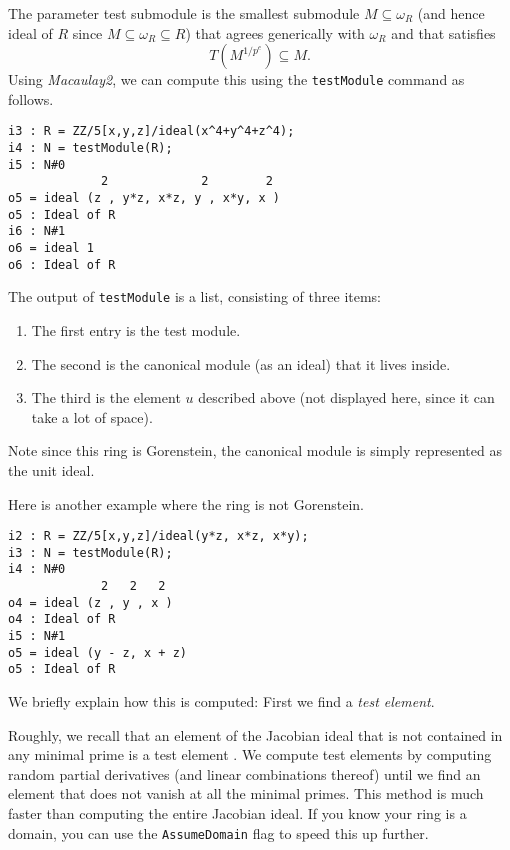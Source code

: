 \documentclass[11pt]{amsart}
\begin{document}
The parameter test submodule is the smallest submodule $M \subseteq \omega_R$ (and hence ideal of $R$ since $M \subseteq \omega_R \subseteq R$) that agrees generically with $\omega_R$ and that satisfies
\[
T (M^{1/p^e}) \subseteq M.
\]
Using \emph{Macaulay2}, we can compute this using the {\tt testModule} command as follows.
\begin{verbatim}
i3 : R = ZZ/5[x,y,z]/ideal(x^4+y^4+z^4);
i4 : N = testModule(R);
i5 : N#0
             2             2        2
o5 = ideal (z , y*z, x*z, y , x*y, x )
o5 : Ideal of R
i6 : N#1
o6 = ideal 1
o6 : Ideal of R
\end{verbatim}
The output of {\tt testModule} is a list, consisting of three items:
\begin{enumerate}
\item The first entry is the test module.
\item The second is the canonical module (as an ideal) that it lives inside.  
\item The third is the element $u$ described above (not displayed here, since it can take a lot of space).  
\end{enumerate}
Note since this ring is Gorenstein, the canonical module is simply represented as the unit ideal.

Here is another example where the ring is not Gorenstein.
\begin{verbatim}
i2 : R = ZZ/5[x,y,z]/ideal(y*z, x*z, x*y);
i3 : N = testModule(R);
i4 : N#0
             2   2   2
o4 = ideal (z , y , x )
o4 : Ideal of R
i5 : N#1
o5 = ideal (y - z, x + z)
o5 : Ideal of R
\end{verbatim}

We briefly explain how this is computed:  First we find a \emph{test element}.
\begin{remark}
\label{rem.ComputationOfTestElements}
Roughly, we recall that an element of the Jacobian ideal that is not contained in any minimal prime is a test element \cite{HochsterFoundations}.  We compute test elements by computing random partial derivatives (and linear combinations thereof) until we find an element that does not vanish at all the minimal primes.  This method is much faster than computing the entire Jacobian ideal.  If you know your ring is a domain, you can use the {\tt AssumeDomain} flag to speed this up further.
\end{remark}
\end{document}
